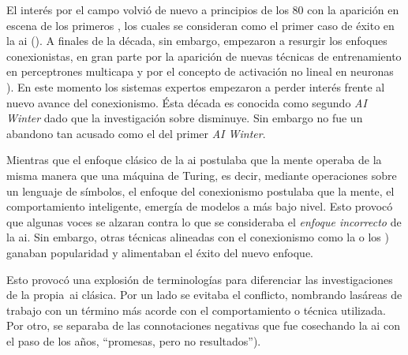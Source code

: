 
El interés por el campo volvió de nuevo a principios de los $80$ con la aparición en escena de los primeros , los cuales se consideran como el primer caso de éxito en la \gls{ai}  (\cite{russell2003artificial}). A finales de la década, sin embargo, empezaron a resurgir los enfoques conexionistas, en gran parte por la aparición de nuevas técnicas de entrenamiento en perceptrones multicapa y por el concepto de activación no lineal en neuronas \cite{rumelhart1985learning, cybenko1989approximation}). En este momento los sistemas expertos empezaron a perder interés frente al nuevo avance del conexionismo. Ésta década es conocida como segundo \textit{AI Winter} dado que la investigación sobre  disminuye. Sin embargo no fue un abandono tan acusado como el del primer \textit{AI Winter}.

Mientras que el enfoque clásico de la \gls{ai} postulaba que la mente operaba de la misma manera que una máquina de Turing, es decir, mediante operaciones sobre un lenguaje de símbolos, el enfoque del conexionismo postulaba que la mente, el comportamiento inteligente, emergía de modelos a más bajo nivel. Esto provocó que algunas voces se alzaran contra lo que se consideraba el \textit{enfoque incorrecto} de la \gls{ai}. Sin embargo, otras técnicas alineadas con el conexionismo como la  o los ) ganaban popularidad y alimentaban el éxito del nuevo enfoque.

Esto provocó una explosión de terminologías para diferenciar las investigaciones de la propia~\ac{ai} clásica. Por un lado se evitaba el conflicto, nombrando lasáreas de trabajo con un término más acorde con el comportamiento o técnica utilizada. Por otro, se separaba de las connotaciones negativas que fue cosechando la \ac{ai} con el paso de los años, \enquote{promesas, pero no resultados}).


